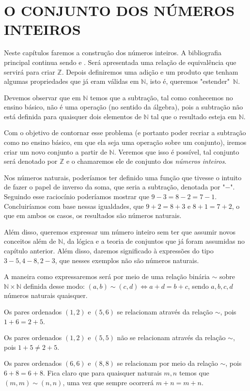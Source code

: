 \documentclass[../main.tex]{subfiles}
\begin{document}
\chapter{O CONJUNTO DOS NÚMEROS INTEIROS}\label{cap-inteiros}
Neste capítulos faremos a construção dos números inteiros. A bibliografia principal continua sendo \textcite{ferreira} e \textcite{domingues-2009}. Será apresentada uma relação de equivalência que servirá para criar $\mathbb{Z}$. Depois definiremos uma adição e um produto que tenham algumas propriedades que já eram válidas em $\mathbb{N}$, isto é, queremos "estender"\ $\mathbb{N}$.

Devemos observar que em $\mathbb{N}$ temos que a subtração, tal como conhecemos no ensino básico, não é uma operação (no sentido da álgebra), pois a subtração não está definida para quaisquer dois elementos de $\mathbb{N}$ tal que o resultado esteja em $\mathbb{N}$.

Com o objetivo de contornar esse problema (e portanto poder recriar a subtração como no ensino básico, em que ela seja uma operação sobre um conjunto), iremos criar um novo conjunto a partir de $\mathbb{N}$. Veremos que isso é possível, tal conjunto será denotado por $\mathbb{Z}$ e o chamaremos ele de conjunto dos \emph{números inteiros}.

Nos números naturais, poderíamos ter definido uma função que tivesse o intuito de fazer o papel de inverso da soma, que seria a subtração, denotada por "$-$". Seguindo esse raciocínio poderíamos mostrar que $9-3 = 8-2 = 7-1$. Concluiríamos com base nessas igualdades, que $9 + 2 = 8 + 3$ e $8 + 1 = 7 + 2$, o que em ambos os casos, os resultados são números naturais. 

Além disso, queremos expressar um número inteiro sem ter que assumir novos conceitos além de $\mathbb{N}$, da lógica e a teoria de conjuntos que já foram assumidas no capítulo anterior. Além disso, daremos significado à expressões do tipo $3-5, 4-8, 2-3$, que nesses exemplos não são números naturais.

A maneira como expressaremos será por meio de uma relação binária $\sim$ sobre $\mathbb{N} \times \mathbb{N}$ definida desse modo: $(a,b) \sim (c,d) \iff a+d = b+c$, sendo $a,b,c,d$ números naturais quaisquer.

\begin{ex}
    Os pares ordenados $(1,2)$ e $(5,6)$ se relacionam através da relação $\sim$, pois $1+6 = 2+5$.
\end{ex}
\begin{ex}
    Os pares ordenados $(1,2)$ e $(5,5)$ não se relacionam através da relação $\sim$, pois $1+5 \neq 2+5$.
\end{ex}
\begin{ex}\label{int-ex-elementosRelacionadosPorSim}
    Os pares ordenados $(6,6)$ e $(8,8)$ se relacionam por meio da relação $\sim$, pois $6+8 = 6+8$. Fica claro que para quaisquer naturais $m,n$ temos que $(m,m) \sim (n,n)$, uma vez que sempre ocorrerá $m+n = m+n$.
\end{ex}
\end{document}
